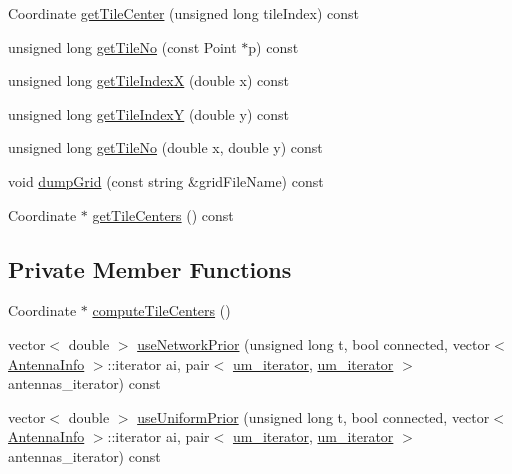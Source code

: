 \begin{DoxyCompactItemize}
\item 
Coordinate \mbox{\hyperlink{class_grid_aa8d3de015a2b22d0cd0d72b3e7c29088}{get\+Tile\+Center}} (unsigned long tile\+Index) const
\item 
unsigned long \mbox{\hyperlink{class_grid_a93e42713b7af1f188ce90f92a5e202ab}{get\+Tile\+No}} (const Point $\ast$p) const
\item 
unsigned long \mbox{\hyperlink{class_grid_a5ab67c336ac08c690a0e8b03c12f02e5}{get\+Tile\+IndexX}} (double x) const
\item 
unsigned long \mbox{\hyperlink{class_grid_ad745f856bb2b27382118ac03fafc06b4}{get\+Tile\+IndexY}} (double y) const
\item 
unsigned long \mbox{\hyperlink{class_grid_a02dee9ad3ee575623916c0041f72eb5e}{get\+Tile\+No}} (double x, double y) const
\item 
void \mbox{\hyperlink{class_grid_a0024d8d3cdd7b95f9fd61205ce8b9dea}{dump\+Grid}} (const string \&grid\+File\+Name) const
\item 
Coordinate $\ast$ \mbox{\hyperlink{class_grid_aa1b1f4c938207b16694a27cb9beb66eb}{get\+Tile\+Centers}} () const
\end{DoxyCompactItemize}
\subsection*{Private Member Functions}
\begin{DoxyCompactItemize}
\item 
Coordinate $\ast$ \mbox{\hyperlink{class_grid_a8948d61db8ba1bda2260590677eaaa01}{compute\+Tile\+Centers}} ()
\item 
vector$<$ double $>$ \mbox{\hyperlink{class_grid_a4bd2091f95030e86b78e7be903667e06}{use\+Network\+Prior}} (unsigned long t, bool connected, vector$<$ \mbox{\hyperlink{class_antenna_info}{Antenna\+Info}} $>$\+::iterator ai, pair$<$ \mbox{\hyperlink{_agents_collection_8h_afde47bc45d604b8b8c72755072376679}{um\+\_\+iterator}}, \mbox{\hyperlink{_agents_collection_8h_afde47bc45d604b8b8c72755072376679}{um\+\_\+iterator}} $>$ antennas\+\_\+iterator) const
\item 
vector$<$ double $>$ \mbox{\hyperlink{class_grid_ac77c744828c5cf70dd5650217475e25b}{use\+Uniform\+Prior}} (unsigned long t, bool connected, vector$<$ \mbox{\hyperlink{class_antenna_info}{Antenna\+Info}} $>$\+::iterator ai, pair$<$ \mbox{\hyperlink{_agents_collection_8h_afde47bc45d604b8b8c72755072376679}{um\+\_\+iterator}}, \mbox{\hyperlink{_agents_collection_8h_afde47bc45d604b8b8c72755072376679}{um\+\_\+iterator}} $>$ antennas\+\_\+iterator) const
\end{DoxyCompactItemize}
